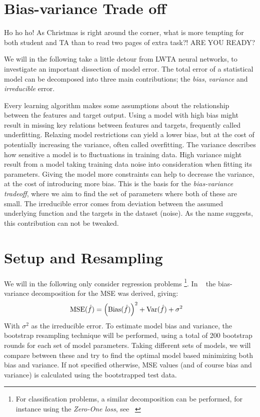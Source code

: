     \section{Bias-variance Trade off}
        Ho ho ho! As Christmas is right around the corner, what is more tempting for both student and TA than to read two pages of extra task?! ARE YOU READY?

        We will in the following take a little detour from LWTA neural networks, to investigate an important dissection of model error. The total error of a statistical model can be decomposed into three main contributions; the \textit{bias}, \textit{variance} and \textit{irreducible} error.
        
        Every learning algorithm makes some assumptions about the relationship between the features and target output. Using a model with high bias might result in missing key relations between features and targets, frequently called underfitting. Relaxing model restrictions can yield a lower bias, but at the cost of potentially increasing the variance, often called overfitting. The variance describes how sensitive a model is to fluctuations in training data. High variance might result from a model taking training data noise into consideration when fitting its parameters. Giving the model more constraints can help to decrease the variance, at the cost of introducing more bias. This is the basis for the \textit{bias-variance tradeoff}, where we aim to find the set of parameters where both of these are small. The irreducible error comes from deviation between the assumed underlying function and the targets in the dataset (noise). As the name suggests, this contribution can not be tweaked.  
        \section{Setup and Resampling}
        We will in the following only consider regression problems \footnote{For classification problems, a similar decomposition can be performed, for instance using the \textit{Zero-One loss}, see ~\citep{zero_one_loss}}. In ~\citep{Project1} the bias-variance decomposition for the MSE was derived, giving:
        \begin{align}
            \operatorname{MSE}(\hat{f}) &= \left(\operatorname{Bias}(\hat{f})\right)^2 + \operatorname{Var}(\hat{f}) + \sigma^2
        \end{align}
        With $\sigma^2$ as the irreducible error. To estimate model bias and variance, the bootstrap resampling technique will be performed, using a total of 200 bootstrap rounds for each set of model parameters. Taking different sets of models, we will compare between these and try to find the optimal model based minimizing both bias and variance. If not specified otherwise, MSE values (and of course bias and variance) is calculated using the bootstrapped test data.

